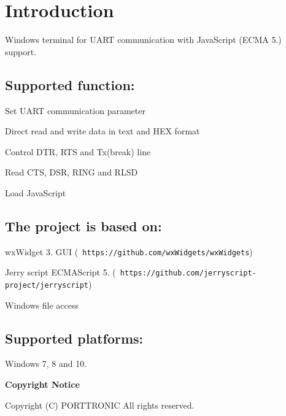\section*{{\bfseries{Introduction}}}

Windows terminal for U\+A\+RT communication with Java\+Script (E\+C\+MA 5.) support.

\subsection*{Supported function\+:}


\begin{DoxyItemize}
\item Set U\+A\+RT communication parameter
\item Direct read and write data in text and H\+EX format
\item Control D\+TR, R\+TS and Tx(break) line
\item Read C\+TS, D\+SR, R\+I\+NG and R\+L\+SD
\item Load Java\+Script
\end{DoxyItemize}

\subsection*{The project is based on\+:}


\begin{DoxyItemize}
\item wx\+Widget 3. G\+UI ({\texttt{ https\+://github.\+com/wx\+Widgets/wx\+Widgets}})
\item Jerry script E\+C\+M\+A\+Script 5. ({\texttt{ https\+://github.\+com/jerryscript-\/project/jerryscript}})
\item Windows file access
\end{DoxyItemize}

\subsection*{Supported platforms\+:}


\begin{DoxyItemize}
\item Windows 7, 8 and 10.
\end{DoxyItemize}

{\bfseries{Copyright Notice}}

Copyright (C) P\+O\+R\+T\+T\+R\+O\+N\+IC All rights reserved. 